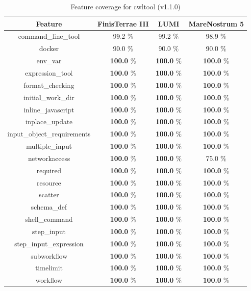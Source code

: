 \documentclass{article}
\begin{document}
\begin{table}[ht!]
\centering
\setlength{\tabcolsep}{6pt}
\renewcommand{\arraystretch}{1.2}
\begin{tabular}{|c|c|c|c|}
\hline
\rowcolor{lightgray!50}
\textbf{Feature} & \textbf{FinisTerrae III} & \textbf{LUMI} & \textbf{MareNostrum 5} \\
\hline
command\_line\_tool & 99.2 \% & 99.2 \% & 98.9 \% \\
docker & 90.0 \% & 90.0 \% & 90.0 \% \\
env\_var & \textbf{100.0} \% & \textbf{100.0} \% & \textbf{100.0} \% \\
expression\_tool & \textbf{100.0} \% & \textbf{100.0} \% & \textbf{100.0} \% \\
format\_checking & \textbf{100.0} \% & \textbf{100.0} \% & \textbf{100.0} \% \\
initial\_work\_dir & \textbf{100.0} \% & \textbf{100.0} \% & \textbf{100.0} \% \\
inline\_javascript & \textbf{100.0} \% & \textbf{100.0} \% & \textbf{100.0} \% \\
inplace\_update & \textbf{100.0} \% & \textbf{100.0} \% & \textbf{100.0} \% \\
input\_object\_requirements & \textbf{100.0} \% & \textbf{100.0} \% & \textbf{100.0} \% \\
multiple\_input & \textbf{100.0} \% & \textbf{100.0} \% & \textbf{100.0} \% \\
networkaccess & \textbf{100.0} \% & \textbf{100.0} \% & 75.0 \% \\
required & \textbf{100.0} \% & \textbf{100.0} \% & \textbf{100.0} \% \\
resource & \textbf{100.0} \% & \textbf{100.0} \% & \textbf{100.0} \% \\
scatter & \textbf{100.0} \% & \textbf{100.0} \% & \textbf{100.0} \% \\
schema\_def & \textbf{100.0} \% & \textbf{100.0} \% & \textbf{100.0} \% \\
shell\_command & \textbf{100.0} \% & \textbf{100.0} \% & \textbf{100.0} \% \\
step\_input & \textbf{100.0} \% & \textbf{100.0} \% & \textbf{100.0} \% \\
step\_input\_expression & \textbf{100.0} \% & \textbf{100.0} \% & \textbf{100.0} \% \\
subworkflow & \textbf{100.0} \% & \textbf{100.0} \% & \textbf{100.0} \% \\
timelimit & \textbf{100.0} \% & \textbf{100.0} \% & \textbf{100.0} \% \\
workflow & \textbf{100.0} \% & \textbf{100.0} \% & \textbf{100.0} \% \\
\hline
\end{tabular}
\caption{Feature coverage for cwltool (v1.1.0)}
\label{tab:cwltool_feat_v11}
\end{table}
\end{document}

